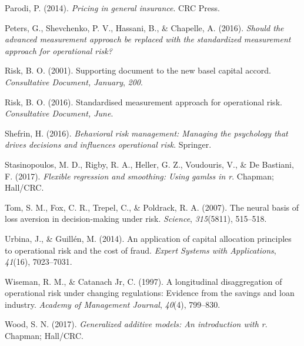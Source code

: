 \documentclass{DissertateUSU}
\begin{document}
\leavevmode\hypertarget{ref-parodi2014pricing}{}%
Parodi, P. (2014). \emph{Pricing in general insurance}. CRC Press.

\leavevmode\hypertarget{ref-peters2016should}{}%
Peters, G., Shevchenko, P. V., Hassani, B., \& Chapelle, A. (2016).
\emph{Should the advanced measurement approach be replaced with the
standardized measurement approach for operational risk?}

\leavevmode\hypertarget{ref-risk2001supporting}{}%
Risk, B. O. (2001). Supporting document to the new basel capital accord.
\emph{Consultative Document, January}, \emph{200}.

\leavevmode\hypertarget{ref-risk2016supporting}{}%
Risk, B. O. (2016). Standardised measurement approach for operational
risk. \emph{Consultative Document, June}.

\leavevmode\hypertarget{ref-shefrin2016behavioral}{}%
Shefrin, H. (2016). \emph{Behavioral risk management: Managing the
psychology that drives decisions and influences operational risk}.
Springer.

\leavevmode\hypertarget{ref-stasinopoulos2017flexible}{}%
Stasinopoulos, M. D., Rigby, R. A., Heller, G. Z., Voudouris, V., \& De
Bastiani, F. (2017). \emph{Flexible regression and smoothing: Using
gamlss in r}. Chapman; Hall/CRC.

\leavevmode\hypertarget{ref-tom2007neural}{}%
Tom, S. M., Fox, C. R., Trepel, C., \& Poldrack, R. A. (2007). The
neural basis of loss aversion in decision-making under risk.
\emph{Science}, \emph{315}(5811), 515--518.

\leavevmode\hypertarget{ref-urbina2014application}{}%
Urbina, J., \& Guillén, M. (2014). An application of capital allocation
principles to operational risk and the cost of fraud. \emph{Expert
Systems with Applications}, \emph{41}(16), 7023--7031.

\leavevmode\hypertarget{ref-wiseman1997longitudinal}{}%
Wiseman, R. M., \& Catanach Jr, C. (1997). A longitudinal disaggregation
of operational risk under changing regulations: Evidence from the
savings and loan industry. \emph{Academy of Management Journal},
\emph{40}(4), 799--830.

\leavevmode\hypertarget{ref-wood2017generalized}{}%
Wood, S. N. (2017). \emph{Generalized additive models: An introduction
with r}. Chapman; Hall/CRC.


\end{document}
